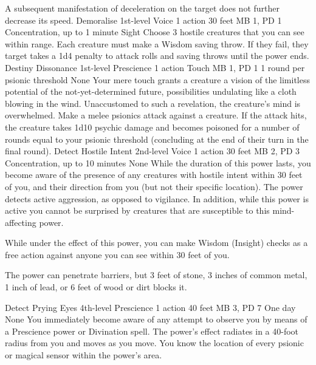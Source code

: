 A subsequent manifestation of deceleration on the target does
not further decrease its speed.
\DndPowerHeader%
    {Demoralise\label{pwr:demoralise}}
    {1st-level Voice}
    {1 action}
    {30 feet}
    {MB 1, PD 1}
    {Concentration, up to 1 minute}
    {Sight}
Choose 3 hostile creatures that you can see
within range. Each creature must make a Wisdom saving throw.
If they fail, they target takes a 1d4 penalty to attack rolls
and saving throws until the power ends.
\DndPowerHeader%
    {Destiny Dissonance\label{pwr:destiny_dissonance}}
    {1st-level Prescience}
    {1 action}
    {Touch}
    {MB 1, PD 1}
    {1 round per psionic threshold}
    {None}
Your mere touch grants a creature a vision
of the limitless potential of the not-yet-determined future,
possibilities undulating like a cloth blowing in the wind.
Unaccustomed to such a revelation, the creature's mind is
overwhelmed. Make a melee psionics attack against a creature.
If the attack hits, the creature takes 1d10 psychic damage
and becomes poisoned for a number of rounds equal to your
psionic threshold (concluding at the end of their turn
in the final round).
\DndPowerHeader%
    {Detect Hostile Intent\label{pwr:detect_hostile_intent}}
    {2nd-level Voice}
    {1 action}
    {30 feet}
    {MB 2, PD 3}
    {Concentration, up to 10 minutes}
    {None}
While the duration of this power lasts, you
become aware of the presence of any creatures with hostile
intent within 30 feet of you, and their direction from you
(but not their specific location). The power detects active
aggression, as opposed to vigilance. In addition, while this
power is active you cannot be surprised by creatures that
are susceptible to this mind-affecting power.

While under the effect of this power, you can make Wisdom
(Insight) checks as a free action against anyone you can see
within 30 feet of you.

The power can penetrate barriers, but 3 feet of stone, 3 inches
of common metal, 1 inch of lead, or 6 feet of wood or dirt
blocks it.

\DndPowerHeader%
    {Detect Prying Eyes\label{pwr:detect_prying_eyes}}
    {4th-level Prescience}
    {1 action}
    {40 feet}
    {MB 3, PD 7}
    {One day}
    {None}
You immediately become aware of any attempt
to observe you by means of a Prescience power or Divination
spell. The power's effect radiates in a 40-foot radius from
you and moves as you move. You know the location of every
psionic or magical sensor within the power's area.

